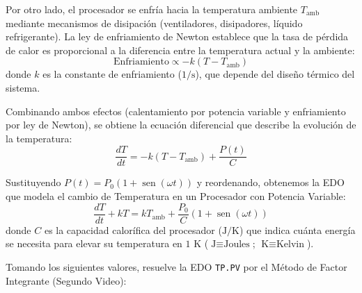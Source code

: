 \begin{enumerate}[label=\arabic*., leftmargin=*]
    Por otro lado, el procesador se enfría hacia la temperatura ambiente $T_{\text{amb}}$ mediante mecanismos de disipación (ventiladores, disipadores, líquido refrigerante). La ley de enfriamiento de Newton establece que la tasa de pérdida de calor es proporcional a la diferencia entre la temperatura actual y la ambiente:
    \[ \text{Enfriamiento} \propto -k(T - T_{\text{amb}}) \]
    donde $k$ es la constante de enfriamiento ($1/\text{s}$), que depende del diseño térmico del sistema.

    Combinando ambos efectos (calentamiento por potencia variable y enfriamiento por ley de Newton), se obtiene la ecuación diferencial que describe la evolución de la temperatura:
    \[ \frac{dT}{dt} = -k(T - T_{\text{amb}}) + \frac{P(t)}{C} \]

    Sustituyendo $P(t) = P_{0}(1 + \operatorname{sen}(\omega t))$ y reordenando, obtenemos la EDO que modela el cambio de Temperatura en un Procesador con Potencia Variable:
    \begin{equation*}
        \frac{dT}{dt} + kT = kT_{\text{amb}} + \frac{P_{0}}{C}(1 + \operatorname{sen}(\omega t)) \tag{TP.PV}
    \end{equation*}
    donde $C$ es la capacidad calorífica del procesador ($\text{J/K}$) que indica cuánta energía se necesita para elevar su temperatura en $1\text{ K}$ ($\text{J} \equiv \text{Joules}$; $\text{K} \equiv \text{Kelvin}$).

    Tomando los siguientes valores, resuelve la EDO \texttt{TP.PV} por el Método de Factor Integrante (Segundo Video):

    \vspace{0.3cm}
    \begin{center}
    \end{center}
    \vspace{0.3cm}


\end{enumerate}
